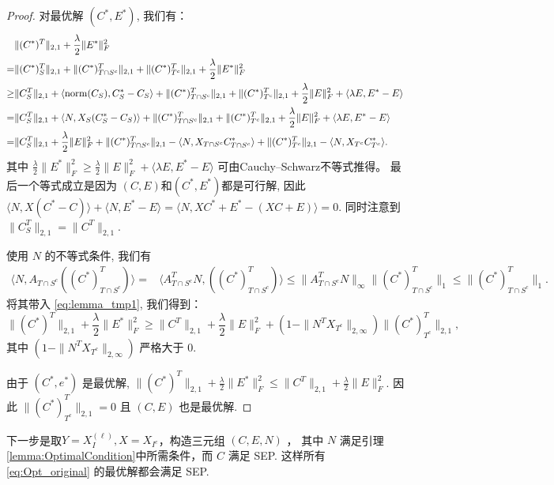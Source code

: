 \documentclass[main.tex]{subfiles}
\begin{document}
\begin{proof}
  对最优解 $(C^{*},E^{*})$, 我们有：
  \begin{align}
    &\|(C^*)^T\|_{2,1}+\frac{\lambda}{2}\|E^*\|_F^2 \nonumber\\
    =& \|(C^*)^T_S\|_{2,1}+\|(C^*)^T_{T\cap
    S^c}\|_{2,1}+\|(C^*)^T_{T^c}\|_{2,1} + \frac{\lambda}{2} \|E^*\|^2_F\nonumber\\
    \geq&\|C^T_S\|_{2,1}+\langle \mathrm{norm}(C_S),C^*_S-C_S\rangle+\|(C^*)^T_{T\cap
    S^c}\|_{2,1}+\|(C^*)^T_{T^c}\|_{2,1} + \frac{\lambda}{2} \|E\|^2_F +\langle
    \lambda E,E^*-E\rangle\nonumber\\
    =&\|C^T_S\|_{2,1}+\langle N,X_S(C^*_S-C_S)\rangle+\|(C^*)^T_{T\cap
    S^c}\|_{2,1}+\|(C^*)^T_{T^c}\|_{2,1} + \frac{\lambda}{2} \|E\|^2_F +\langle
    \lambda E,E^*-E\rangle\nonumber\\
    =&\|C^T_S\|_{2,1}+\frac{\lambda}{2} \|E\|_F^2+ \|(C^*)^T_{T\cap
    S^c}\|_{2,1}-\langle N,X_{T\cap S^c}C^*_{T\cap S^c}\rangle
    +\|(C^*)^T_{T^c}\|_{2,1}-\langle N,X_{T^c}C^*_{T^c}\rangle. \label{eq:lemma_tmp1}
  \end{align}
  其中 $\frac{\lambda}{2} \|E^*\|_F^2 \geq \frac{\lambda}{2} \|E\|_F^2 +\langle
  \lambda E,E^*-E\rangle$ 可由Cauchy–Schwarz不等式推得。
  最后一个等式成立是因为 $(C,E)$和$(C^*,E^*)$都是可行解, 因此$\langle
  N,X(C^*-C)\rangle+\langle N,E^*-E\rangle = \langle
  N,XC^*+E^*-(XC+E)\rangle=0$. 同时注意到 $\| C^T_S\|_{2, 1} = \|C^T\|_{2, 1}$.

  使用 $N$ 的不等式条件, 我们有
  \begin{align*}
    \langle N,A_{T\cap S^c}((C^*)^T_{T\cap S^c})\rangle=&\langle A_{T\cap S^c}^TN,((C^*)^T_{T\cap S^c})\rangle
    \leq \|A^T_{T\cap S^{c}}N\|_{\infty}\|(C^*)^T_{T\cap S^c}\|_1\leq\|(C^*)^T_{T\cap S^c}\|_1.
  \end{align*}
  将其带入 \eqref{eq:lemma_tmp1}, 我们得到：
  \begin{equation*}
    \|(C^*)^T\|_{2,1}+\frac{\lambda}{2} \|E^*\|^2_F \geq \|C^T\|_{2,1}+ \frac{\lambda}{2} 
    \|E\|_F^2 +(1-\|N^T X_{T^{c}}\|_{2, \infty})\|(C^*)^T_{T^c}\|_{2,1},
  \end{equation*}
  其中 $(1-\|N^T X_{T^{c}}\|_{2, \infty})$ 严格大于 $0$.

  由于 $(C^*,e^*)$ 是最优解, $\|(C^*)^T\|_{2,1}+\frac{\lambda}{2}
  \|E^*\|_F^2\leq \|C^T\|_{2, 1}+\frac{\lambda}{2} \|E\|_F^2$. 
  因此 $\|(C^*)^T_{T^c}\|_{2,1}=0$ 且 $(C,E)$ 也是最优解.
\end{proof}

下一步是取$Y=X_I^{(\ell)}, X=X_{I^c}$，构造三元组 $(C,E,N)$ ，
其中 $N$ 满足引理\ref{lemma:OptimalCondition}中所需条件，而 $C$ 满足 SEP. 
这样所有 \eqref{eq:Opt_original} 的最优解都会满足 SEP.
\end{document}
